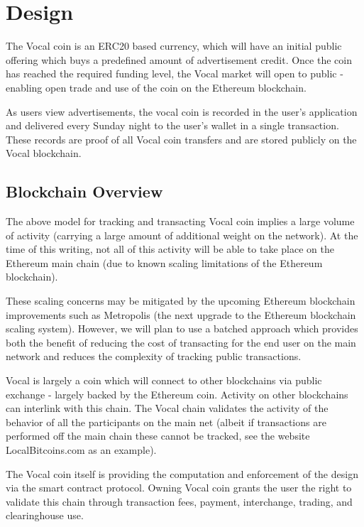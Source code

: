 \documentclass[conference]{IEEEtran}
\begin{document}
    \section{Design}

    The Vocal coin is an ERC20 based currency, which will have an initial public offering which buys a predefined amount of advertisement credit. Once the coin has reached the required funding level, the Vocal market will open to public - enabling open trade and use of the coin on the Ethereum blockchain.

    As users view advertisements, the vocal coin is recorded in the user's application and delivered every Sunday night to the user's wallet in a single transaction. 
    These records are proof of all Vocal coin transfers and are stored publicly on the Vocal blockchain. 


    \subsection{Blockchain Overview}

    The above model for tracking and transacting Vocal coin implies a large volume of activity (carrying a large amount of additional weight on the network). At the time of this writing, not all of this activity will be able to take place on the Ethereum main chain (due to known scaling limitations of the Ethereum blockchain).


    These scaling concerns may be mitigated by the upcoming Ethereum blockchain improvements such as Metropolis (the next upgrade to the Ethereum blockchain scaling system). However, we will plan to use a batched approach which provides both the benefit of reducing the cost of transacting for the end user on the main network and reduces the complexity of tracking public transactions.

   Vocal is largely a coin which will connect to other blockchains via public exchange - largely backed by the Ethereum coin. Activity on other blockchains can interlink with this chain. The Vocal chain validates the activity of the behavior of all the participants on the main net (albeit if transactions are performed off the main chain these cannot be tracked, see the website LocalBitcoins.com as an example).

    The Vocal coin itself is providing the computation and enforcement of the design via the smart contract protocol. Owning Vocal coin grants the user the right to validate this chain through transaction fees, payment, interchange, trading, and clearinghouse use. 
\end{document}
